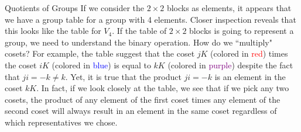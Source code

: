 \begin{section}{Quotients of Groups}
If we consider the \(2\times 2\) blocks as elements, it appears that we have a group table for a group with 4 elements.  Closer inspection reveals that this looks like the table for \(V_4\).  If the table of \(2\times 2\) blocks is going to represent a group, we need to understand the binary operation.  How do we ``multiply" cosets?  For example, the table suggest that the coset \(jK\) (colored in \textcolor{red}{red}) times the coset \(iK\) (colored in \textcolor{blue}{blue}) is equal to \(kK\) (colored in \textcolor{purple}{purple}) despite the fact that \(ji=-k\neq k\).  Yet, it is true that the product \(ji=-k\) is an element in the coset \(kK\).  In fact, if we look closely at the table, we see that if we pick any two cosets, the product of any element of the first coset times any element of the second coset will always result in an element in the same coset regardless of which representatives we chose.


\end{section}
